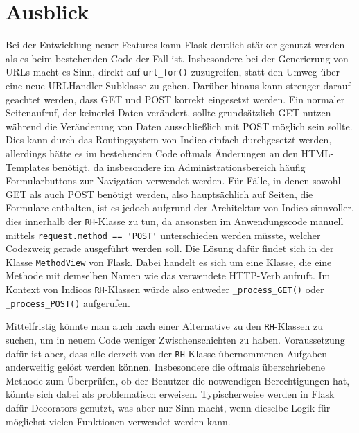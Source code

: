 \section{Ausblick}

Bei der Entwicklung neuer Features kann Flask deutlich stärker genutzt werden als es beim
bestehenden Code der Fall ist. Insbesondere bei der Generierung von URLs macht es Sinn, direkt auf
\lstinline{url_for()} zuzugreifen, statt den Umweg über eine neue URLHandler-Subklasse zu gehen.
Darüber hinaus kann strenger darauf geachtet werden, dass GET und POST korrekt eingesetzt werden.
Ein normaler Seitenaufruf, der keinerlei Daten verändert, sollte grundsätzlich GET nutzen während
die Veränderung von Daten ausschließlich mit POST möglich sein sollte. Dies kann durch das
Routingsystem von Indico einfach durchgesetzt werden, allerdings hätte es im bestehenden Code
oftmals Änderungen an den HTML-Templates benötigt, da insbesondere im Administrationsbereich häufig
Formularbuttons zur Navigation verwendet werden. Für Fälle, in denen sowohl GET als auch POST
benötigt werden, also hauptsächlich auf Seiten, die Formulare enthalten, ist es jedoch aufgrund
der Architektur von Indico sinnvoller, dies innerhalb der \lstinline{RH}-Klasse zu tun, da ansonsten
im Anwendungscode manuell mittels \lstinline{request.method == 'POST'} unterschieden werden müsste,
welcher Codezweig gerade ausgeführt werden soll. Die Lösung dafür findet sich in der Klasse
\lstinline{MethodView} von Flask. Dabei handelt es sich um eine Klasse, die eine Methode mit
demselben Namen wie das verwendete HTTP-Verb aufruft. Im Kontext von Indicos \lstinline{RH}-Klassen
würde also entweder \lstinline{_process_GET()} oder \lstinline{_process_POST()} aufgerufen.

Mittelfristig könnte man auch nach einer Alternative zu den \lstinline{RH}-Klassen zu suchen, um in
neuem Code weniger Zwischenschichten zu haben. Voraussetzung dafür ist aber, dass alle derzeit von
der \lstinline{RH}-Klasse übernommenen Aufgaben anderweitig gelöst werden können. Insbesondere die
oftmals überschriebene Methode zum Überprüfen, ob der Benutzer die notwendigen Berechtigungen hat,
könnte sich dabei als problematisch erweisen. Typischerweise werden in Flask dafür Decorators
genutzt, was aber nur Sinn macht, wenn dieselbe Logik für möglichst vielen Funktionen verwendet
werden kann.
